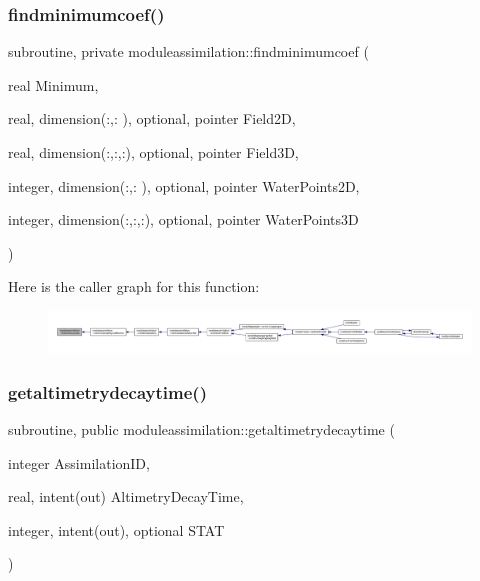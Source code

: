 \subsubsection{\texorpdfstring{findminimumcoef()}{findminimumcoef()}}
{\footnotesize\ttfamily subroutine, private moduleassimilation\+::findminimumcoef (\begin{DoxyParamCaption}\item[{real}]{Minimum,  }\item[{real, dimension(\+:,\+:  ), optional, pointer}]{Field2D,  }\item[{real, dimension(\+:,\+:,\+:), optional, pointer}]{Field3D,  }\item[{integer, dimension(\+:,\+:  ), optional, pointer}]{Water\+Points2D,  }\item[{integer, dimension(\+:,\+:,\+:), optional, pointer}]{Water\+Points3D }\end{DoxyParamCaption})\hspace{0.3cm}{\ttfamily [private]}}

Here is the caller graph for this function\+:\nopagebreak
\begin{figure}[H]
\begin{center}
\leavevmode
\includegraphics[width=350pt]{namespacemoduleassimilation_a9edf40407a0e79e84d746e6bf866bf17_icgraph}
\end{center}
\end{figure}
\mbox{\label{namespacemoduleassimilation_aaab7e59362629aa1c11d99a2b3b6ad30}} 
\subsubsection{\texorpdfstring{getaltimetrydecaytime()}{getaltimetrydecaytime()}}
{\footnotesize\ttfamily subroutine, public moduleassimilation\+::getaltimetrydecaytime (\begin{DoxyParamCaption}\item[{integer}]{Assimilation\+ID,  }\item[{real, intent(out)}]{Altimetry\+Decay\+Time,  }\item[{integer, intent(out), optional}]{S\+T\+AT }\end{DoxyParamCaption})}

